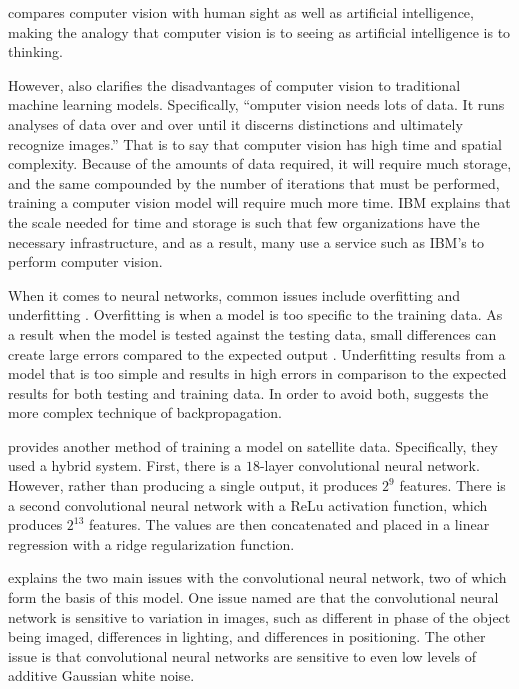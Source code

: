 \documentclass[11pt]{report}
\begin{document}
\textcite{IBM2020a} compares computer vision with human sight as well as artificial intelligence,
making the analogy that computer vision is to seeing as artificial intelligence is to thinking.

However, \textcite{IBM2020a} also clarifies the disadvantages of computer vision to traditional machine learning models.
Specifically, ``omputer vision needs lots of data. It runs analyses of data over and over until it discerns distinctions and ultimately recognize images.''
That is to say that computer vision has high time and spatial complexity.
Because of the amounts of data required,
it will require much storage,
and the same compounded by the number of iterations that must be performed,
training a computer vision model will require much more time.
IBM explains that the scale needed for time and storage is such that few organizations have the necessary infrastructure,
and as a result, many use a service such as IBM's to perform computer vision\cite{IBM2020a}.

When it comes to neural networks,
common issues include overfitting and underfitting%
\cite{Vignesh2020a}\cite{Lawrence2005a}.
Overfitting is when a model is too specific to the training data.
As a result when the model is tested against the testing data,
small differences can create large errors compared to the expected output%
\cite{Gao2022a}.
Underfitting results from a model that is too simple
and results in high errors in comparison to the expected results
for both testing and training data\cite{Vignesh2020a}.
In order to avoid both, \textcite{Lawrence2005a} suggests the more complex technique of backpropagation.

\textcite{Rolf2021a} provides another method of training a model on satellite data.
Specifically, they used a hybrid system.
First, there is a \(18\)-layer convolutional neural network\cite{MATLAB2018resnet_a}.
However, rather than producing a single output,
it produces \(2^{9}\) features.
There is a second convolutional neural network with a ReLu activation function, which produces \(2^{13}\) features\cite{Rolf2021a}.
The values are then concatenated and placed in a linear regression with a ridge regularization function\cite{Rolf2021a}.

\textcite{Sharma2020a} explains the two main issues with the convolutional neural network, two of which form the basis of this model.
One issue named are that the convolutional neural network is sensitive to variation in images,
such as different in phase of the object being imaged,
differences in lighting,
and differences in positioning.
The other issue is that convolutional neural networks are sensitive to even low levels of additive Gaussian white noise.
\end{document}

